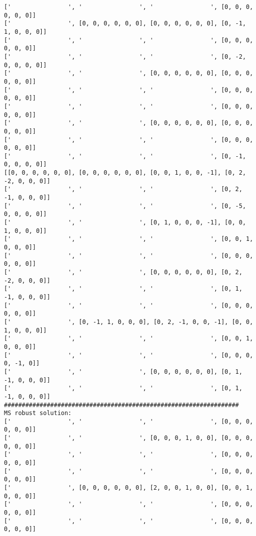 \documentclass[10pt]{article}
\theoremstyle{plain}
\theoremstyle{definition}
\theoremstyle{remark}
\begin{document}
\begin{minipage}[t]{8cm}
\begin{verbatim}
['                ', '                ', '                ', [0, 0, 0, 0, 0, 0]]
['                ', [0, 0, 0, 0, 0, 0], [0, 0, 0, 0, 0, 0], [0, -1, 1, 0, 0, 0]]
['                ', '                ', '                ', [0, 0, 0, 0, 0, 0]]
['                ', '                ', '                ', [0, -2, 0, 0, 0, 0]]
['                ', '                ', [0, 0, 0, 0, 0, 0], [0, 0, 0, 0, 0, 0]]
['                ', '                ', '                ', [0, 0, 0, 0, 0, 0]]
['                ', '                ', '                ', [0, 0, 0, 0, 0, 0]]
['                ', '                ', [0, 0, 0, 0, 0, 0], [0, 0, 0, 0, 0, 0]]
['                ', '                ', '                ', [0, 0, 0, 0, 0, 0]]
['                ', '                ', '                ', [0, -1, 0, 0, 0, 0]]
[[0, 0, 0, 0, 0, 0], [0, 0, 0, 0, 0, 0], [0, 0, 1, 0, 0, -1], [0, 2, -2, 0, 0, 0]]
['                ', '                ', '                ', [0, 2, -1, 0, 0, 0]]
['                ', '                ', '                ', [0, -5, 0, 0, 0, 0]]
['                ', '                ', [0, 1, 0, 0, 0, -1], [0, 0, 1, 0, 0, 0]]
['                ', '                ', '                ', [0, 0, 1, 0, 0, 0]]
['                ', '                ', '                ', [0, 0, 0, 0, 0, 0]]
['                ', '                ', [0, 0, 0, 0, 0, 0], [0, 2, -2, 0, 0, 0]]
['                ', '                ', '                ', [0, 1, -1, 0, 0, 0]]
['                ', '                ', '                ', [0, 0, 0, 0, 0, 0]]
['                ', [0, -1, 1, 0, 0, 0], [0, 2, -1, 0, 0, -1], [0, 0, 1, 0, 0, 0]]
['                ', '                ', '                ', [0, 0, 1, 0, 0, 0]]
['                ', '                ', '                ', [0, 0, 0, 0, -1, 0]]
['                ', '                ', [0, 0, 0, 0, 0, 0], [0, 1, -1, 0, 0, 0]]
['                ', '                ', '                ', [0, 1, -1, 0, 0, 0]]
##################################################################
MS robust solution:
['                ', '                ', '                ', [0, 0, 0, 0, 0, 0]]
['                ', '                ', [0, 0, 0, 1, 0, 0], [0, 0, 0, 0, 0, 0]]
['                ', '                ', '                ', [0, 0, 0, 0, 0, 0]]
['                ', '                ', '                ', [0, 0, 0, 0, 0, 0]]
['                ', [0, 0, 0, 0, 0, 0], [2, 0, 0, 1, 0, 0], [0, 0, 1, 0, 0, 0]]
['                ', '                ', '                ', [0, 0, 0, 0, 0, 0]]
['                ', '                ', '                ', [0, 0, 0, 0, 0, 0]]

\end{verbatim}
\end{minipage}
\end{document}
